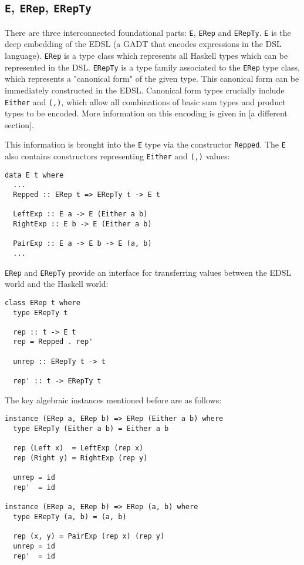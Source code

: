 \documentclass[acmsmall]{acmart}
\newcommand{\ttt}{\texttt}
\begin{document}
\subsection{\ttt{E}, \ttt{ERep}, \ttt{ERepTy}}

There are three interconnected foundational parts: \ttt{E}, \ttt{ERep} and
\ttt{ERepTy}. \ttt{E} is the deep embedding of the EDSL (a GADT that encodes
expressions in the DSL language). \ttt{ERep} is a type class which represents
all Haskell types which can be represented in the DSL. \ttt{ERepTy} is a type
family associated to the \ttt{ERep} type class, which represents a "canonical form"
of the given type. This canonical form can be immediately constructed in the EDSL.
Canonical form types crucially include \ttt{Either} and \ttt{(,)}, which
allow all combinations of basic sum types and product types to be encoded. More
information on this encoding is given in [a different section].

This information is brought into the \ttt{E} type via the constructor
\ttt{Repped}. The \ttt{E} also contains constructors representing \ttt{Either}
and \ttt{(,)} values:

\begin{lstlisting}
data E t where
  ...
  Repped :: ERep t => ERepTy t -> E t

  LeftExp :: E a -> E (Either a b)
  RightExp :: E b -> E (Either a b)

  PairExp :: E a -> E b -> E (a, b)
  ...
\end{lstlisting}

\ttt{ERep} and \ttt{ERepTy} provide an interface for transferring values between the EDSL
world and the Haskell world:

\begin{lstlisting}
class ERep t where
  type ERepTy t

  rep :: t -> E t
  rep = Repped . rep'

  unrep :: ERepTy t -> t

  rep' :: t -> ERepTy t
\end{lstlisting}

The key algebraic instances mentioned before are as follows:

\begin{lstlisting}
instance (ERep a, ERep b) => ERep (Either a b) where
  type ERepTy (Either a b) = Either a b

  rep (Left x)  = LeftExp (rep x)
  rep (Right y) = RightExp (rep y)

  unrep = id
  rep'  = id

instance (ERep a, ERep b) => ERep (a, b) where
  type ERepTy (a, b) = (a, b)

  rep (x, y) = PairExp (rep x) (rep y)
  unrep = id
  rep'  = id
\end{lstlisting}
\end{document}
